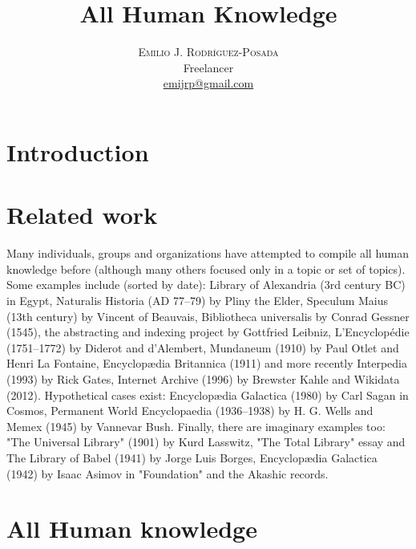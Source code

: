 \documentclass[11pt,twocolumn]{article}
\title{\vspace{-15mm}
	\fontsize{24pt}{10pt}\selectfont
	\textbf{All Human Knowledge}
	}
\author{
	\large
	\textsc{Emilio J. Rodríguez-Posada} \\
	\normalsize	Freelancer \\
	\normalsize	\href{mailto:emijrp@gmail.com}{emijrp@gmail.com}
	\vspace{-5mm}
	}
\date{}
\begin{document}

\section{Introduction}

\section{Related work}

Many individuals, groups and organizations have attempted to compile all human knowledge before (although many others focused only in a topic or set of topics). Some examples include (sorted by date): Library of Alexandria (3rd century BC) in Egypt, Naturalis Historia (AD 77–79) by Pliny the Elder, Speculum Maius (13th century) by Vincent of Beauvais, Bibliotheca universalis by Conrad Gessner (1545), the abstracting and indexing project by Gottfried Leibniz, L'Encyclopédie (1751–1772) by Diderot and d'Alembert, Mundaneum (1910) by Paul Otlet and Henri La Fontaine, Encyclopædia Britannica (1911) and more recently Interpedia (1993) by Rick Gates, Internet Archive (1996) by Brewster Kahle and Wikidata (2012). Hypothetical cases exist: Encyclopædia Galactica (1980) by Carl Sagan in Cosmos, Permanent World Encyclopaedia (1936–1938) by H. G. Wells and Memex (1945) by Vannevar Bush. Finally, there are imaginary examples too: "The Universal Library" (1901) by Kurd Lasswitz, "The Total Library" essay and The Library of Babel (1941) by Jorge Luis Borges, Encyclopædia Galactica (1942) by Isaac Asimov in "Foundation" and the Akashic records.

\section{All Human knowledge}
\end{document}
